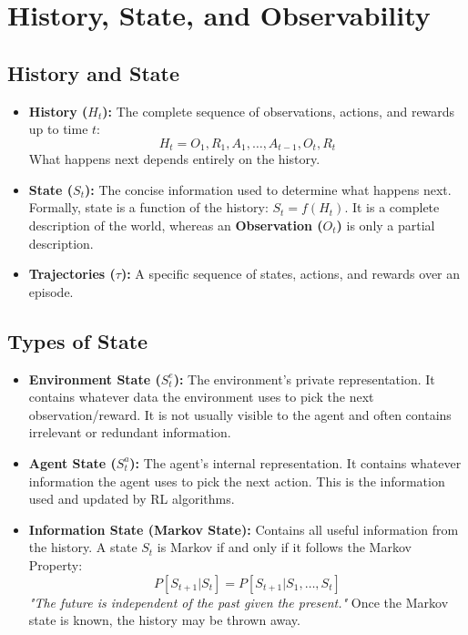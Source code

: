 \documentclass[12pt]{article}
\begin{document}
\section*{History, State, and Observability}
\subsection*{History and State}
\begin{itemize}[label=$\bullet$]
    \item \textbf{History ($H_t$):} The complete sequence of observations, actions, and rewards up to time $t$: 
    $$H_t = O_1, R_1, A_1, \dots, A_{t-1}, O_t, R_t$$
    What happens next depends entirely on the history.
    \item \textbf{State ($S_t$):} The concise information used to determine what happens next. Formally, state is a function of the history: $S_t = f(H_t)$. It is a complete description of the world, whereas an \textbf{Observation ($O_t$)} is only a partial description.
    \item \textbf{Trajectories ($\tau$):} A specific sequence of states, actions, and rewards over an episode.
\end{itemize}

\subsection*{Types of State}
\begin{itemize}[label=$\bullet$]
    \item \textbf{Environment State ($S_t^e$):} The environment's private representation. It contains whatever data the environment uses to pick the next observation/reward. It is not usually visible to the agent and often contains irrelevant or redundant information.
    \item \textbf{Agent State ($S_t^a$):} The agent's internal representation. It contains whatever information the agent uses to pick the next action. This is the information used and updated by RL algorithms.
    \item \textbf{Information State (Markov State):} Contains all useful information from the history. A state $S_t$ is Markov if and only if it follows the Markov Property: 
    $$P[S_{t+1} | S_t] = P[S_{t+1} | S_1, \dots, S_t]$$
    \textit{"The future is independent of the past given the present."} Once the Markov state is known, the history may be thrown away.
\end{itemize}
\end{document}

